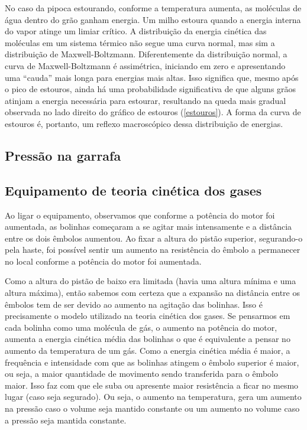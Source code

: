 No caso da pipoca estourando, conforme a temperatura aumenta, as moléculas de água dentro do grão ganham energia. Um milho estoura quando a energia interna do vapor atinge um limiar crítico. A distribuição da energia cinética das moléculas em um sistema térmico não segue uma curva normal, mas sim a distribuição de Maxwell-Boltzmann. Diferentemente da distribuição normal, a curva de Maxwell-Boltzmann é assimétrica, iniciando em zero e apresentando uma ``cauda'' mais longa para energias mais altas. Isso significa que, mesmo após o pico de estouros, ainda há uma probabilidade significativa de que alguns grãos atinjam a energia necessária para estourar, resultando na queda mais gradual observada no lado direito do gráfico de estouros (\cref{estouros}). A forma da curva de estouros é, portanto, um reflexo macroscópico dessa distribuição de energias.

\subsection{Pressão na garrafa}

\subsection{Equipamento de teoria cinética dos gases}

Ao ligar o equipamento, observamos que conforme a potência do motor foi aumentada, as bolinhas começaram a se agitar mais intensamente e a distância entre os dois êmbolos aumentou. Ao fixar a altura do pistão superior, segurando-o pela haste, foi possível sentir um aumento na resistência do êmbolo a permanecer no local conforme a potência do motor foi aumentada. 

Como a altura do pistão de baixo era limitada (havia uma altura mínima e uma altura máxima), então sabemos com certeza que a expansão na distância entre os êmbolos tem de ser devido ao aumento na agitação das bolinhas. Isso é precisamente o modelo utilizado na teoria cinética dos gases. Se pensarmos em cada bolinha como uma molécula de gás, o aumento na potência do motor, aumenta a energia cinética média das bolinhas o que é equivalente a pensar no aumento da temperatura de um gás. Como a energia cinética média é maior, a frequência e intensidade com que as bolinhas atingem o êmbolo superior é maior, ou seja, a maior quantidade de movimento sendo transferida para o êmbolo maior. Isso faz com que ele suba ou apresente maior resistência a ficar no mesmo lugar (caso seja segurado). Ou seja, o aumento na temperatura, gera um aumento na pressão caso o volume seja mantido constante ou um aumento no volume caso a pressão seja mantida constante. 
